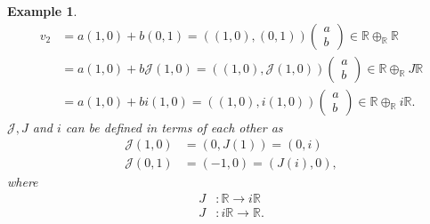 \documentclass[aps,preprint]{revtex4}
\newtheorem{example}[theorem]{Example}
\begin{document}
\begin{example}
\begin{align}
v_{2}& =a\left( 1,0\right) +b\left( 0,1\right) =\left( \left( 1,0\right)
,\left( 0,1\right) \right) \left( 
\begin{array}{c}
a \\ 
b%
\end{array}%
\right) \in \mathbb{R\oplus _{\mathbb{R}}R} \\
& =a\left( 1,0\right) +b\mathcal{J}\left( 1,0\right) =\left( \left(
1,0\right) ,\mathcal{J}\left( 1,0\right) \right) \left( 
\begin{array}{c}
a \\ 
b%
\end{array}%
\right) \in \mathbb{R}\oplus _{\mathbb{R}}J\mathbb{R} \\
& =a\left( 1,0\right) +bi\left( 1,0\right) =\left( \left( 1,0\right)
,i\left( 1,0\right) \right) \left( 
\begin{array}{c}
a \\ 
b%
\end{array}%
\right) \in \mathbb{R}\oplus _{\mathbb{R}}i\mathbb{R}.
\end{align}%
$\mathcal{J},J$ and $i$ can be defined in terms of each other as 
\begin{align}
\mathcal{J}\left( 1,0\right) & =\left( 0,J\left( 1\right) \right) =\left(
0,i\right) \\
\mathcal{J}\left( 0,1\right) & =\left( -1,0\right) =\left( J\left( i\right)
,0\right) ,
\end{align}%
where 
\begin{align}
J& :\mathbb{R}\rightarrow i\mathbb{R} \\
J& :i\mathbb{R}\rightarrow \mathbb{R}.
\end{align}
\end{example}
\end{document}

